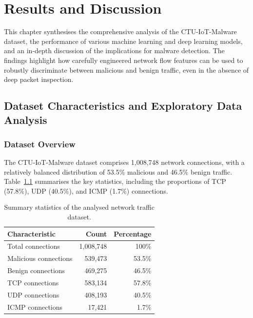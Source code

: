 \chapter{Results and Discussion}

This chapter synthesises the comprehensive analysis of the CTU-IoT-Malware dataset, the performance of various machine learning and deep learning models, and an in‐depth discussion of the implications for malware detection. The findings highlight how carefully engineered network flow features can be used to robustly discriminate between malicious and benign traffic, even in the absence of deep packet inspection.

\section{Dataset Characteristics and Exploratory Data Analysis}

\subsection{Dataset Overview}

The CTU-IoT-Malware dataset comprises 1,008,748 network connections, with a relatively balanced distribution of 53.5\% malicious and 46.5\% benign traffic. Table~\ref{tab:dataset_summary} summarises the key statistics, including the proportions of TCP (57.8\%), UDP (40.5\%), and ICMP (1.7\%) connections.

\begin{table}[htb]
\center
\begin{tabular}{lrr}
\hline
\textbf{Characteristic} & \textbf{Count} & \textbf{Percentage} \\
\hline
Total connections        & 1,008,748      & 100\%   \\
Malicious connections    & 539,473        & 53.5\%  \\
Benign connections       & 469,275        & 46.5\%  \\
\hline
TCP connections          & 583,134        & 57.8\%  \\
UDP connections          & 408,193        & 40.5\%  \\
ICMP connections         & 17,421         & 1.7\%   \\
\hline
\end{tabular}
\caption{Summary statistics of the analysed network traffic dataset.}
\label{tab:dataset_summary}
\end{table}

